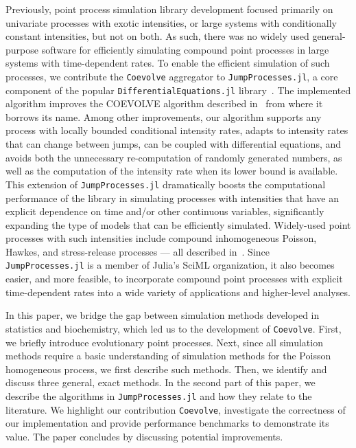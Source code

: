 \documentclass{juliacon}
\numberwithin{equation}{section}
\begin{document}
Previously, point process simulation library development focused primarily on univariate processes with exotic intensities, or large systems with conditionally constant intensities, but not on both. As such, there was no widely used general-purpose software for efficiently simulating compound point processes in large systems with time-dependent rates. To enable the efficient simulation of such processes, we contribute the \texttt{Coevolve} aggregator to \texttt{JumpProcesses.jl}, a core component of the popular \texttt{DifferentialEquations.jl} library~\cite{rackauckas2017}. The implemented algorithm improves the COEVOLVE algorithm described in~\cite{farajtabar2017} from where it borrows its name. Among other improvements, our algorithm supports any process with locally bounded conditional intensity rates, adapts to intensity rates that can change between jumps, can be coupled with differential equations, and avoids both the unnecessary re-computation of randomly generated numbers, as well as the computation of the intensity rate when its lower bound is available. This extension of \texttt{JumpProcesses.jl} dramatically boosts the computational performance of the library in simulating processes with intensities that have an explicit dependence on time and/or other continuous variables,  significantly expanding the type of models that can be efficiently simulated. Widely-used point processes with such intensities include compound inhomogeneous Poisson, Hawkes, and stress-release processes --- all described in~\cite{daley2003}. Since \texttt{JumpProcesses.jl} is a member of Julia's SciML organization, it also becomes easier, and more feasible, to incorporate compound point processes with explicit time-dependent rates into a wide variety of applications and higher-level analyses.

In this paper, we bridge the gap between simulation methods developed in statistics and biochemistry, which led us to the development of \texttt{Coevolve}. First, we briefly introduce evolutionary point processes. Next, since all simulation methods require a basic understanding of simulation methods for the Poisson homogeneous process, we first describe such methods. Then, we identify and discuss three general, exact methods. In the second part of this paper, we describe the algorithms in \texttt{JumpProcesses.jl} and how they relate to the literature. We highlight our contribution \texttt{Coevolve}, investigate the correctness of our implementation and provide performance benchmarks to demonstrate its value. The paper concludes by discussing potential improvements.
\end{document}
